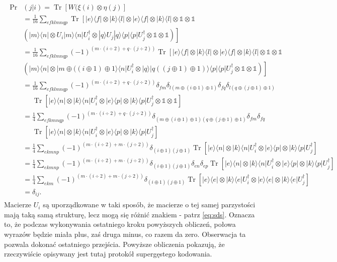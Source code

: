 \documentclass[10pt]{article} %
\DeclareMathOperator{\Trs}{Tr}
\newcommand{\Ket}[1]{|#1\rangle}
\newcommand{\Bra}[1]{\langle#1|}
\newcommand{\I}{\mathbb{1}}
\begin{document}
\begin{gather}
\label{eq:sds}
\begin{split}
\Pr&(j|i) = \Trs \left[ W (\xi(i) \otimes \eta(j)\right] \\
 &= \frac{1}{16}\sum_{efklmnqp} \Trs \left[\Ket{e}\Bra{f} \otimes \Ket{k}\Bra{l} \otimes \Ket{e}\Bra{f} \otimes  \Ket{k}\Bra{l} \otimes \I \otimes \I \right. \\&\left.\left( \Ket{m}\Bra{n} \otimes U_i\Ket{m}\Bra{n}U_i^\dag \otimes \Ket{q}U_j\Ket{q}\Bra{p}\Bra{p}U_j^\dag\otimes \I\otimes \I\right)\right] \\
&= \frac{1}{16} \sum_{efklmnqp} (-1)^{(m\cdot (i \div 2) + q \cdot (j \div 2))} \Trs\left[\Ket{e}\Bra{f} \otimes \Ket{k}\Bra{l} \otimes \Ket{e}\Bra{f} \otimes  \Ket{k}\Bra{l} \otimes \I \otimes \I \right. \\ & \left. \left( \Ket{m}\Bra{n} \otimes \Ket{m \oplus ((i \oplus 1) \oplus 1}\Bra{n}U_i^\dag \otimes \Ket{q}\Ket{q ((j \oplus 1) \oplus 1)}\Bra{p}\Bra{p}U_j^\dag\otimes \I\otimes \I\right)\right]\\
 &= \frac{1}{16} \sum_{efklmnqp}  (-1)^{(m\cdot (i \div 2) + q \cdot (j \div 2))} \delta_{fm}
\delta_{l(m \oplus (i \oplus 1) \oplus 1)}
\delta_{fq} 
\delta_{l(q \oplus (j \oplus 1) \oplus 1)}\\&~~~~~~ \Trs \left[ \Ket{e}\Bra{n} \otimes \Ket{k}\Bra{n}U_i^\dag\otimes \Ket{e}\Bra{p} \otimes \Ket{k}\Bra{p}U_j^\dag \otimes \I \otimes \I\right] \\
&=\frac{1}{4} \sum_{efkmnqp}  (-1)^{(m\cdot (i \div 2) + q \cdot (j \div 2))} \delta_{(m \oplus (i \oplus 1) \oplus 1)(q \oplus (j \oplus 1) \oplus 1)} \delta_{fm} \delta_{fq} \\& ~~~~~~\Trs \left [ \Ket{e}\Bra{n} \otimes \Ket{k}\Bra{n}U_i^\dag\otimes \Ket{e}\Bra{p} \otimes \Ket{k}\Bra{p}U_j^\dag \right] \\
&=  \frac{1}{4} \sum_{ekmnp}  (-1)^{(m\cdot (i \div 2) + m \cdot (j \div 2))} \delta_{(i \oplus 1)(j \oplus 1)} \Trs \left [ \Ket{e}\Bra{n} \otimes \Ket{k}\Bra{n}U_i^\dag\otimes \Ket{e}\Bra{p} \otimes \Ket{k}\Bra{p}U_j^\dag \right] \\
&= \frac{1}{4} \sum_{ekmnp}  (-1)^{(m\cdot (i \div 2) + m \cdot (j \div 2))} \delta_{(i \oplus 1)(j \oplus 1)} \delta_{en} \delta_{ep}   \Trs \left [ \Ket{e}\Bra{n} \otimes \Ket{k}\Bra{n}U_i^\dag\otimes \Ket{e}\Bra{p} \otimes \Ket{k}\Bra{p}U_j^\dag \right] \\
&= \frac{1}{4}\sum_{ekm} (-1)^{(m\cdot (i \div 2) + m \cdot (j \div 2))} \delta_{(i \oplus 1)(j \oplus 1)} \Trs \left [ \Ket{e}\Bra{e} \otimes \Ket{k}\Bra{e}U_i^\dag\otimes \Ket{e}\Bra{e} \otimes \Ket{k}\Bra{e}U_j^\dag \right] \\
&= \delta_{ij}.
\end{split}
\end{gather} Macierze $U_i$ są uporządkowane w taki sposób, że macierze o tej samej parzystości mają taką samą strukturę, lecz mogą się różnić znakiem - patrz \eqref{eq:sds}. Oznacza to, że podczas wykonywania ostatniego kroku powyższych obliczeń, połowa wyrazów będzie miała plus, zaś druga minus, co razem da zero. Obserwacja ta pozwala dokonać ostatniego przejścia. Powyższe obliczenia pokazują, że rzeczywiście opisywany jest tutaj protokół supergęstego kodowania.
\end{document}
